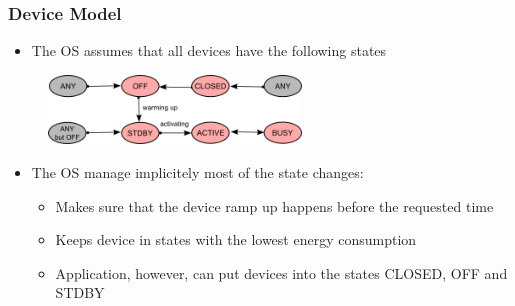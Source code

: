 \begin{frame}[fragile]
  	\frametitle{Device Model}
  	\begin{itemize}
  		\item The OS assumes that all devices have the following states
  	\end{itemize}
  	\begin{figure}
  		\centering
   		\includegraphics[width=0.6\textwidth]{img/sdev-states.png}
  	\end{figure}
  	\begin{itemize}
 		\item The OS manage implicitely most of the state changes:
	 	 \begin{itemize}
	  		\item Makes sure that the device ramp up happens before the requested time
			\item Keeps device in states with the lowest energy consumption
			\item Application, however, can put devices into the states CLOSED, OFF and STDBY
		\end{itemize}
	\end{itemize}
\end{frame}

